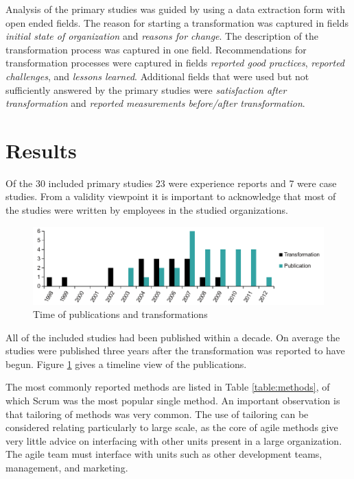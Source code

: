 \documentclass[lnbip]{svmultln}
\begin{document}

Analysis of the primary studies was guided by using a data extraction form with
open ended fields. The reason for starting a transformation was captured in
fields \textit{initial state of organization} and \textit{reasons for change}.
The description of the transformation process was captured in one field.
Recommendations for transformation processes were captured in fields
\textit{reported good practices}, \textit{reported challenges}, and
\textit{lessons learned}.
Additional fields that were used but not sufficiently answered by the primary
studies were \textit{satisfaction after transformation} and \textit{reported
measurements before/after transformation}.


\section{Results}
\label{sec:results}

Of the 30 included primary studies 23 were experience reports and 7 were case
studies. From a validity viewpoint it is important to acknowledge that most of
the studies were written by employees in the studied organizations.

\begin{figure}[b]
  \begin{center}
    \includegraphics[width=1\textwidth]{publicationschart.pdf}
    \caption{Time of publications and transformations}
    \label{fig:publications}
  \end{center}
\end{figure}

All of the included studies had been published within a decade. On average the
studies were published three years after the transformation was reported to
have begun. Figure \ref{fig:publications} gives a timeline view of the
publications.

The most commonly reported methods are listed in Table \ref{table:methods}, of
which Scrum was the most popular single method. An important observation is that
tailoring of methods was very common. The use of tailoring can be considered
relating particularly to large scale, as the core of agile methods give very
little advice on interfacing with other units present in a large organization.
The agile team must interface with units such as other development teams,
management, and marketing.
\end{document}
